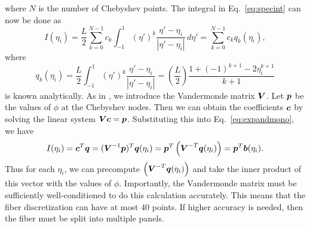 where $N$ is the number of Chebyshev points. The integral in Eq.\ \eqref{eq:specint} can now be done as
\begin{equation}
\label{eq:expandmono}
I(\eta_i)= \frac{L}{2} \sum_{k=0}^{N-1} c_k \int_{-1}^1 (\eta')^k \frac{\eta'-\eta_i}{|\eta'-\eta_i|} \, d\eta' = \sum_{k=0}^{N-1} c_k q_k(\eta_i), 
\end{equation}
where 
\begin{equation}
q_k(\eta_i) = \frac{L}{2}\int_{-1}^1 (\eta')^k \frac{\eta'-\eta_i}{|\eta'-\eta_i|} = \left(\frac{L}{2}\right)\frac{1+(-1)^{k+1}-2\eta_i^{k+1}}{k+1}
\end{equation}
is known analytically. As in \cite{tornquad}, we introduce the Vandermonde matrix $\boldsymbol{V}$. Let $\boldsymbol{p}$ be the values of $\phi$ at the Chebyshev nodes. Then we can obtain the coefficients $\boldsymbol{c}$ by solving the linear system $\boldsymbol{V}\boldsymbol{c}=\boldsymbol{p}$. Substituting this into Eq.\ \eqref{eq:expandmono}, we have 
\begin{equation}
\label{eq:specscheme}
I(\eta_i)=\boldsymbol{c}^T \boldsymbol{q} = (\boldsymbol{V}^{-1}\boldsymbol{p})^T \boldsymbol{q}(\eta_i) = \boldsymbol{p}^T \left(\boldsymbol{V}^{-T}\boldsymbol{q}(\eta_i)\right) = \boldsymbol{p}^T \boldsymbol{b}(\eta_i). 
\end{equation}
Thus for each $\eta_i$, we can precompute $\left(\boldsymbol{V}^{-T}\boldsymbol{q}(\eta_i)\right)$ and take the inner product of this vector with the values of $\phi$. Importantly, the Vandermonde matrix must be sufficiently well-conditioned to do this calculation accurately. This means that the fiber discretization can have at most 40 points. If higher accuracy is needed, then the fiber must be split into multiple panels. 
